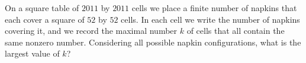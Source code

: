 \begin{problem}
On a square table of $2011$ by $2011$ cells we place a finite number of napkins that each cover a square of $52$ by $52$ cells. In each cell we write the number of napkins covering it, and we record the maximal number $k$ of cells that all contain the same nonzero number. Considering all possible napkin configurations, what is the largest value of $k$?

\end{problem}

%

